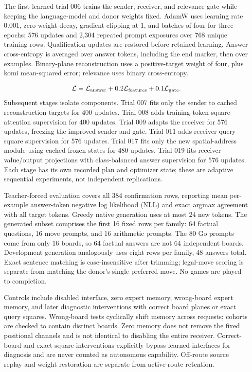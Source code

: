 \documentclass[11pt]{article}
\begin{document}
The first learned trial 006 trains the sender, receiver, and relevance gate while keeping the language-model and donor weights fixed. AdamW uses learning rate 0.001, zero weight decay, gradient clipping at 1, and batches of four for three epochs: 576 updates and 2,304 repeated prompt exposures over 768 unique training rows. Qualification updates are restored before retained learning. Answer cross-entropy is averaged over answer tokens, including the end marker, then over examples. Binary-plane reconstruction uses a positive-target weight of four, plus komi mean-squared error; relevance uses binary cross-entropy.

\[\mathcal L=\mathcal L_{\rm answer}+0.2\mathcal L_{\rm features}+0.1\mathcal L_{\rm gate}.\]
Subsequent stages isolate components. Trial 007 fits only the sender to cached reconstruction targets for 400 updates. Trial 008 adds training-token square-attention supervision for 400 updates. Trial 009 adapts the receiver for 576 updates, freezing the improved sender and gate. Trial 011 adds receiver query-square supervision for 576 updates. Trial 017 fits only the new spatial-address module using cached frozen states for 480 updates. Trial 019 fits receiver value/output projections with class-balanced answer supervision for 576 updates. Each stage has its own recorded plan and optimizer state; these are adaptive sequential experiments, not independent replications.

Teacher-forced evaluation covers all 384 confirmation rows, reporting mean per-example answer-token negative log likelihood (NLL) and exact argmax agreement with all target tokens. Greedy native generation uses at most 24 new tokens. The generated subset comprises the first 16 fixed rows per family: 64 factual questions, 16 move prompts, and 16 arithmetic prompts. The 80 Go prompts come from only 16 boards, so 64 factual answers are not 64 independent boards. Development generation analogously uses eight rows per family, 48 answers total. Exact sentence matching is case-insensitive after trimming; legal-move scoring is separate from matching the donor's single preferred move. No games are played to completion.

Controls include disabled interface, zero expert memory, wrong-board expert memory, and later diagnostic interventions with correct board planes or exact query squares. Wrong-board tests cyclically shift memory across requests; cohorts are checked to contain distinct boards. Zero memory does not remove the fixed positional channels and is not identical to disabling the entire receiver. Correct-board and exact-square interventions explicitly bypass learned interfaces for diagnosis and are never counted as autonomous capability. Off-route source replay and weight restoration are separate from active-route retention.
\end{document}
